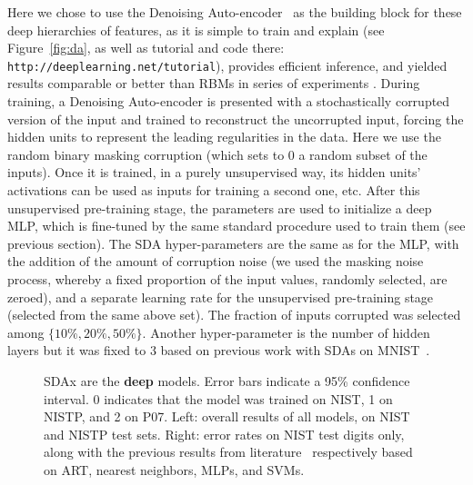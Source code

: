 \documentclass{article} %
\begin{document}
Here we chose to use the Denoising
Auto-encoder~\citep{VincentPLarochelleH2008} as the building block for
these deep hierarchies of features, as it is simple to train and
explain (see Figure~\ref{fig:da}, as well as 
tutorial and code there: {\tt http://deeplearning.net/tutorial}), 
provides efficient inference, and yielded results
comparable or better than RBMs in series of experiments
\citep{VincentPLarochelleH2008}. During training, a Denoising
Auto-encoder is presented with a stochastically corrupted version
of the input and trained to reconstruct the uncorrupted input,
forcing the hidden units to represent the leading regularities in
the data. Here we use the random binary masking corruption
(which sets to 0 a random subset of the inputs).
 Once it is trained, in a purely unsupervised way, 
its hidden units' activations can
be used as inputs for training a second one, etc.
After this unsupervised pre-training stage, the parameters
are used to initialize a deep MLP, which is fine-tuned by
the same standard procedure used to train them (see previous section).
The SDA hyper-parameters are the same as for the MLP, with the addition of the
amount of corruption noise (we used the masking noise process, whereby a
fixed proportion of the input values, randomly selected, are zeroed), and a
separate learning rate for the unsupervised pre-training stage (selected
from the same above set). The fraction of inputs corrupted was selected
among $\{10\%, 20\%, 50\%\}$. Another hyper-parameter is the number
of hidden layers but it was fixed to 3 based on previous work with
SDAs on MNIST~\citep{VincentPLarochelleH2008}.

\vspace*{-1mm}

\begin{figure}[ht]
\vspace*{-2mm}
\centerline{}
\vspace*{-3mm}
\caption{SDAx are the {\bf deep} models. Error bars indicate a 95\% confidence interval. 0 indicates that the model was trained
on NIST, 1 on NISTP, and 2 on P07. Left: overall results
of all models, on NIST and NISTP test sets.
Right: error rates on NIST test digits only, along with the previous results from 
literature~\citep{Granger+al-2007,Cortes+al-2000,Oliveira+al-2002-short,Milgram+al-2005}
respectively based on ART, nearest neighbors, MLPs, and SVMs.}
\label{fig:error-rates-charts}
\vspace*{-2mm}
\end{figure}
\end{document}
